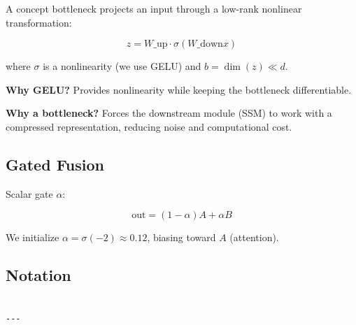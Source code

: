 A concept bottleneck projects an input through a low-rank nonlinear 
transformation:

\[
z = W\_\text{up} \cdot \sigma(W\_\text{down} x)
\tag{3.5}
\]

where $\sigma$ is a nonlinearity (we use GELU) and $b = \dim(z) \ll d$.

\textbf{Why GELU?} Provides nonlinearity while keeping the bottleneck 
differentiable.

\textbf{Why a bottleneck?} Forces the downstream module (SSM) to work with a 
compressed representation, reducing noise and computational cost.

\subsection{Gated Fusion}

Scalar gate $\alpha$:

\[
\text{out} = (1 - \alpha) A + \alpha B
\tag{3.6}
\]

We initialize $\alpha = \sigma(-2) \approx 0.12$, biasing toward $A$ 
(attention).

\subsection{Notation}

\begin{lstlisting}

---
\end{lstlisting}